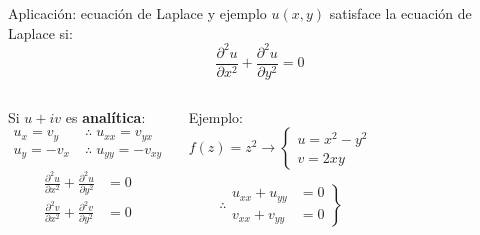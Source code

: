\documentclass[9pt, aspectratio=169]{beamer}
\begin{document}
\begin{frame}{Aplicación: ecuación de Laplace y ejemplo}
$u(x, y)$ satisface la ecuación de Laplace si: 
\[\boxed{ \frac{\partial^2 u}{\partial x^2} + \frac{\partial^2 u}{\partial y^2} = 0 } \] \pause
\vspace{1em}

\begin{columns}[t]
 \cx
 Si $u + i v$ es \textbf{analítica}:
 \begin{align*}
  u_x = v_y \; &\therefore \; u_{xx} = v_{yx} \\
  u_y = -v_x \; &\therefore \; u_{yy} = -v_{xy} \\
 \end{align*} \vspace{-3em}
 \begin{align*}
  \frac{\partial^2 u}{\partial x^2} + \frac{\partial^2 u}{\partial y^2} &= 0 \\
  \frac{\partial^2 v}{\partial x^2} + \frac{\partial^2 v}{\partial y^2} &= 0
 \end{align*} \pause

 \cx
 \begin{exampleblock}{Ejemplo:}
 \[ f(z) = z^2 \longrightarrow 
 \begin{cases}
  u = x^2 - y^2 \\
  v = 2 x y
 \end{cases}
\]

\[
\therefore \left. { \begin{array}{ll}
                   u_{xx} + u_{yy} &= 0 \\
                   v_{xx} + v_{yy} &= 0 
                  \end{array} }
            \right\}
\]
 \end{exampleblock}
\end{columns}
\end{frame}
\end{document}
